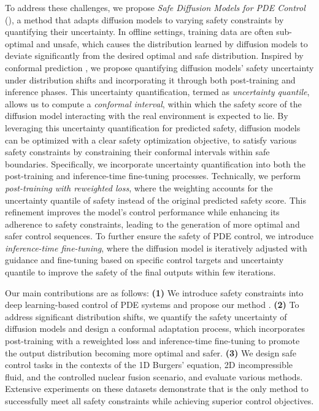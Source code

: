 To address these challenges, we propose \emph{Safe Diffusion Models for PDE Control} (\proj), a method that adapts diffusion models to varying safety constraints by quantifying their uncertainty. 
In offline settings, training data are often sub-optimal and unsafe, which causes the distribution learned by diffusion models to deviate significantly from the desired optimal and safe distribution. Inspired by conformal prediction \citep{vovk2005algorithmic, Tibshirani2019ConformalPU}, we propose quantifying diffusion models' safety uncertainty under distribution shifts and incorporating it through both post-training and inference phases.
This uncertainty quantification, termed as \textit{uncertainty quantile}, allows us to compute a \emph{conformal interval}, within which the safety score of the diffusion model interacting with the real environment is expected to lie. By leveraging this uncertainty quantification for predicted safety, diffusion models can be optimized with a clear safety optimization objective, to satisfy various safety constraints by constraining their conformal intervals within safe boundaries. 
Specifically, we incorporate uncertainty quantification into both the post-training and inference-time fine-tuning processes. Technically, we perform \textit{post-training with reweighted loss}, where the weighting accounts for the uncertainty quantile of safety instead of the original predicted safety score. This refinement improves the model's control performance while enhancing its adherence to safety constraints, leading to the generation of more optimal and safer control sequences. To further ensure the safety of PDE control, we introduce \textit{inference-time fine-tuning}, where the diffusion model is iteratively adjusted with guidance and fine-tuning based on specific control targets and uncertainty quantile to improve the safety of the final outputs within few iterations.

Our main contributions are as follows:
\textbf{(1)} We introduce safety constraints into deep learning-based control of PDE systems and propose our method \proj.
\textbf{(2)} To address significant distribution shifts, we quantify the safety uncertainty of diffusion models and design a conformal adaptation process, which incorporates post-training with a reweighted loss and inference-time fine-tuning to promote the output distribution becoming more optimal and safer. 
\textbf{(3)} We design safe control tasks in the contexts of the 1D Burgers' equation, 2D incompressible fluid, and the controlled nuclear fusion scenario, and evaluate various methods. Extensive experiments on these datasets demonstrate that \proj is the only method to successfully meet all safety constraints while achieving superior control objectives.









